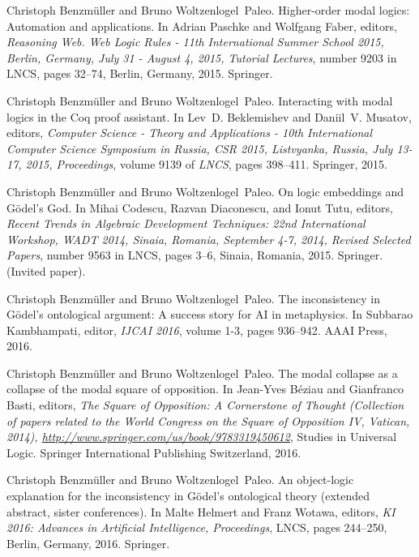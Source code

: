 \documentclass{llncs}
\begin{document}
\begin{thebibliography}{10}
Christoph Benzm{\"u}ller and Bruno Woltzenlogel~Paleo.
\newblock Higher-order modal logics: Automation and applications.
\newblock In Adrian Paschke and Wolfgang Faber, editors, {\em Reasoning Web.
  Web Logic Rules - 11th International Summer School 2015, Berlin, Germany,
  July 31 - August 4, 2015, Tutorial Lectures}, number 9203 in LNCS, pages
  32--74, Berlin, Germany, 2015. Springer.

Christoph Benzm{\"{u}}ller and Bruno Woltzenlogel~Paleo.
\newblock Interacting with modal logics in the {Coq} proof assistant.
\newblock In Lev~D. Beklemishev and Daniil~V. Musatov, editors, {\em Computer
  Science - Theory and Applications - 10th International Computer Science
  Symposium in Russia, {CSR} 2015, Listvyanka, Russia, July 13-17, 2015,
  Proceedings}, volume 9139 of {\em LNCS}, pages 398--411. Springer, 2015.

Christoph Benzm{\"u}ller and Bruno Woltzenlogel~Paleo.
\newblock On logic embeddings and {G\"odel's} {God}.
\newblock In Mihai Codescu, Razvan Diaconescu, and Ionut Tutu, editors, {\em
  Recent Trends in Algebraic Development Techniques: 22nd International
  Workshop, WADT 2014, Sinaia, Romania, September 4-7, 2014, Revised Selected
  Papers}, number 9563 in LNCS, pages 3--6, Sinaia, Romania, 2015. Springer.
\newblock (Invited paper).

Christoph Benzm{\"u}ller and Bruno Woltzenlogel~Paleo.
\newblock The inconsistency in {G{\"o}del's} ontological argument: A success
  story for {AI} in metaphysics.
\newblock In Subbarao Kambhampati, editor, {\em IJCAI 2016}, volume 1-3, pages
  936--942. AAAI Press, 2016.

Christoph Benzm{\"u}ller and Bruno Woltzenlogel~Paleo.
\newblock The modal collapse as a collapse of the modal square of opposition.
\newblock In Jean-Yves B\'{e}ziau and Gianfranco Basti, editors, {\em The
  Square of Opposition: A Cornerstone of Thought (Collection of papers related
  to the World Congress on the Square of Opposition IV, Vatican, 2014),
  \url{http://www.springer.com/us/book/9783319450612}}, Studies in Universal
  Logic. Springer International Publishing Switzerland, 2016.

Christoph Benzm{\"u}ller and Bruno Woltzenlogel~Paleo.
\newblock An object-logic explanation for the inconsistency in {G\"odel's}
  ontological theory (extended abstract, sister conferences).
\newblock In Malte Helmert and Franz Wotawa, editors, {\em KI 2016: Advances in
  Artificial Intelligence, Proceedings}, LNCS, pages 244--250, Berlin, Germany,
  2016. Springer.


\end{thebibliography}
\end{document}
